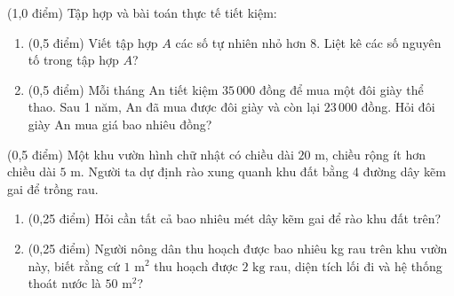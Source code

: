 \documentclass[12pt,a4paper]{article}
\begin{document}
\begin{ex} (1,0 điểm)
Tập hợp và bài toán thực tế tiết kiệm:
\begin{enumerate}[label=\textbf{\alph*)}, leftmargin=0.8cm, itemsep=2pt]
\item (0,5 điểm) Viết tập hợp $A$ các số tự nhiên nhỏ hơn 8. Liệt kê các số nguyên tố trong tập hợp $A$?
\item (0,5 điểm) Mỗi tháng An tiết kiệm $35\,000$ đồng để mua một đôi giày thể thao. Sau 1 năm, An đã mua được đôi giày và còn lại $23\,000$ đồng. Hỏi đôi giày An mua giá bao nhiêu đồng?
\end{enumerate}
\end{ex}
\vspace{2mm}

\begin{ex} (0,5 điểm)
Một khu vườn hình chữ nhật có chiều dài $20\text{ m}$, chiều rộng ít hơn chiều dài $5\text{ m}$. Người ta dự định rào xung quanh khu đất bằng 4 đường dây kẽm gai để trồng rau.
\begin{enumerate}[label=\textbf{\alph*)}, leftmargin=0.8cm, itemsep=2pt]
\item (0,25 điểm) Hỏi cần tất cả bao nhiêu mét dây kẽm gai để rào khu đất trên?
\item (0,25 điểm) Người nông dân thu hoạch được bao nhiêu kg rau trên khu vườn này, biết rằng cứ $1\text{ m}^2$ thu hoạch được $2\text{ kg}$ rau, diện tích lối đi và hệ thống thoát nước là $50\text{ m}^2$?
\end{enumerate}
\end{ex}
\vspace{2mm}
\end{document}

